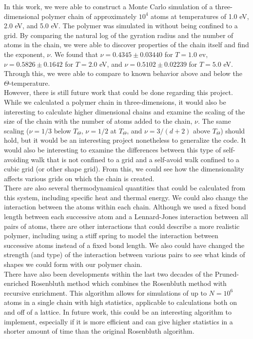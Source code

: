 \documentclass{article}
\begin{document}
\begin{multicols}{2}
In this work, we were able to construct a Monte Carlo simulation of a three-dimensional polymer chain of approximately $10^4$ atoms at temperatures of 1.0 eV, 2.0 eV, and 5.0 eV.  The polymer was simulated in without being confined to a grid.  By comparing the natural log of the gyration radius and the number of atoms in the chain, we were able to discover properties of the chain itself and find the exponent, $\nu$.  We found that $\nu = 0.4345 \pm 0.03440$ for $T = 1.0 $ ev, $\nu = 0.5826 \pm 0.1642$ for $T =2.0$ eV, and $\nu = 0.5102 \pm 0.02239$ for $T=5.0$ eV.  Through this, we were able to compare to known behavior above and below the $\Theta$-temperature.  \\

However, there is still future work that could be done regarding this project.  While we calculated a polymer chain in three-dimensions, it would also be interesting to calculate higher dimensional chains and examine the scaling of the size of the chain with the number of atoms added to the chain, $\nu$.  The same scaling ($\nu = 1/3$ below $T_\Theta$, $\nu = 1/2$ at $T_\Theta$, and $\nu = 3/(d+2)$ above $T_\Theta$) should hold, but it would be an interesting project nonetheless to generalize the code.  It would also be interesting to examine the differences between this type of self-avoiding walk that is not confined to a grid and a self-avoid walk confined to a cubic grid (or other shape grid).  From this, we could see how the dimensionality affects various grids on which the chain is created.  \\

There are also several thermodynamical quantities that could be calculated from this system, including specific heat and thermal energy.  We could also change the interaction between the atoms within each chain.  Although we used a fixed bond length between each successive atom and a Lennard-Jones interaction between all pairs of atoms, there are other interactions that could describe a more realistic polymer, including using a stiff spring to model the interaction between successive atoms instead of a fixed bond length.  We also could have changed the strength (and type) of the interaction between various pairs to see what kinds of shapes we could form with our polymer chain.  \\

There have also been developments within the last two decades of the Pruned-enriched Rosenbluth method which combines the Rosenbluth method with recursive enrichment.  This algorithm allows for simulations of up to $N=10^6$ atoms in a single chain with high statistics, applicable to calculations both on and off of a lattice.  \cite{PERM}  In future work, this could be an interesting algorithm to implement, especially if it is more efficient and can give higher statistics in a shorter amount of time than the original Rosenbluth algorithm.  \\


\end{multicols}
\end{document}
